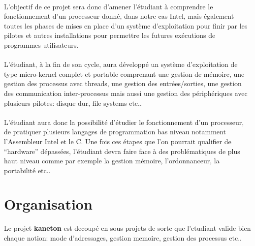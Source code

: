 \documentclass[10pt,a4wide]{article}
\begin{document}
\paragraph{}

L'objectif de ce projet sera donc d'amener l'\'etudiant \`a comprendre le
fonctionnement d'un processeur donn\'e, dans notre cas Intel, mais \'egalement
toutes les phases de mises en place d'un syst\`eme d'exploitation pour finir
par les pilotes et autres installations pour permettre les futures ex\'ecutions
de programmes utilisateurs.

\paragraph{}

L'\'etudiant, \`a la fin de son cycle, aura d\'evelopp\'e un syst\`eme
d'exploitation de type micro-kernel complet et portable comprenant une
gestion de m\'emoire, une gestion des processus avec threads, une gestion
des entr\'ees/sorties, une gestion des communication inter-processus
mais aussi une gestion des p\'eriph\'eriques avec plusieurs pilotes:
disque dur, file systems etc..

\paragraph{}

L'\'etudiant aura donc la possibilit\'e d'\'etudier le fonctionnement d'un
processeur, de pratiquer plusieurs langages de programmation bas niveau
notamment l'Assembleur Intel et le C. Une fois ces \'etapes que l'on pourrait
qualifier de ``hardware'' d\'epass\'ees, l'\'etudiant devra faire face
\`a des probl\'ematiques de plus haut niveau comme par exemple la gestion
m\'emoire, l'ordonnanceur, la portabilit\'e etc..

\newpage

\section{Organisation}

\paragraph{}

Le projet \textbf{kaneton} est decoup\'e en sous projets de sorte que
l'etudiant valide bien chaque notion: mode d'adressages, gestion memoire,
gestion des processus etc..
\end{document}
